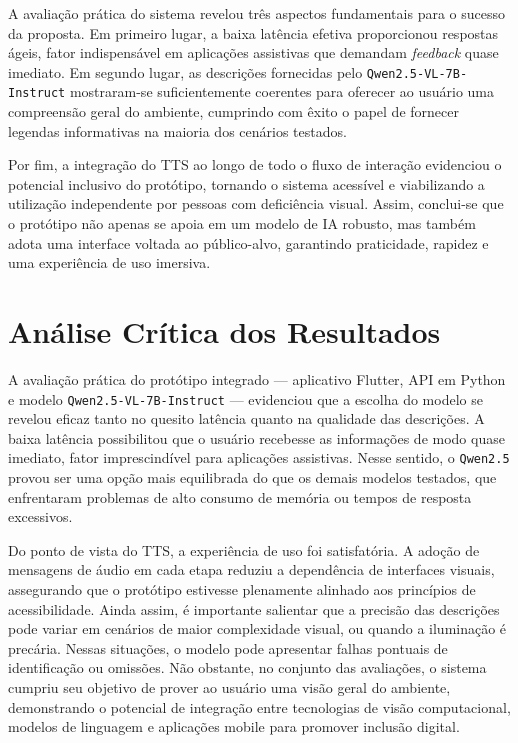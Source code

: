 A avaliação prática do sistema revelou três aspectos fundamentais para o sucesso da proposta. Em primeiro lugar, a baixa latência efetiva proporcionou respostas ágeis, fator indispensável em aplicações assistivas que demandam \textit{feedback} quase imediato. Em segundo lugar, as descrições fornecidas pelo \texttt{Qwen2.5-VL-7B-Instruct} mostraram-se suficientemente coerentes para oferecer ao usuário uma compreensão geral do ambiente, cumprindo com êxito o papel de fornecer legendas informativas na maioria dos cenários testados.

Por fim, a integração do TTS ao longo de todo o fluxo de interação evidenciou o potencial inclusivo do protótipo, tornando o sistema acessível e viabilizando a utilização independente por pessoas com deficiência visual. Assim, conclui-se que o protótipo não apenas se apoia em um modelo de IA robusto, mas também adota uma interface voltada ao público-alvo, garantindo praticidade, rapidez e uma experiência de uso imersiva.

\section{Análise Crítica dos Resultados}

A avaliação prática do protótipo integrado — aplicativo Flutter, API em Python e modelo \texttt{Qwen2.5-VL-7B-Instruct} — evidenciou que a escolha do modelo se revelou eficaz tanto no quesito latência quanto na qualidade das descrições. A baixa latência possibilitou que o usuário recebesse as informações de modo quase imediato, fator imprescindível para aplicações assistivas. Nesse sentido, o \texttt{Qwen2.5} provou ser uma opção mais equilibrada do que os demais modelos testados, que enfrentaram problemas de alto consumo de memória ou tempos de resposta excessivos.

Do ponto de vista do TTS, a experiência de uso foi satisfatória. A adoção de mensagens de áudio em cada etapa reduziu a dependência de interfaces visuais, assegurando que o protótipo estivesse plenamente alinhado aos princípios de acessibilidade. Ainda assim, é importante salientar que a precisão das descrições pode variar em cenários de maior complexidade visual, ou quando a iluminação é precária. Nessas situações, o modelo pode apresentar falhas pontuais de identificação ou omissões. Não obstante, no conjunto das avaliações, o sistema cumpriu seu objetivo de prover ao usuário uma visão geral do ambiente, demonstrando o potencial de integração entre tecnologias de visão computacional, modelos de linguagem e aplicações mobile para promover inclusão digital.

